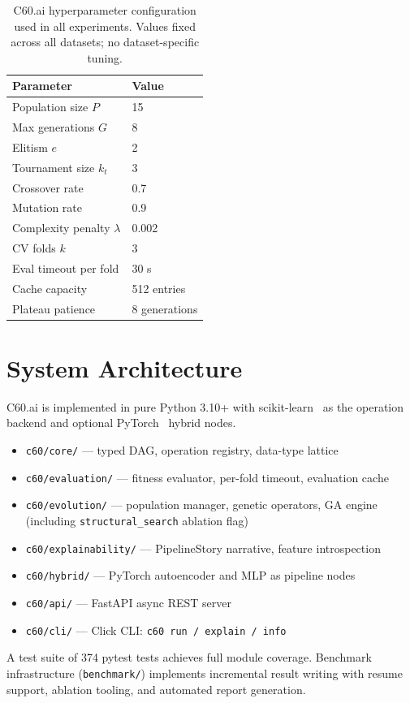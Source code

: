 \documentclass{article}
\theoremstyle{definition}
\theoremstyle{plain}
\theoremstyle{remark}
\begin{document}
\begin{table}[H]
  \caption{C60.ai hyperparameter configuration used in all experiments.
    Values fixed across all datasets; no dataset-specific tuning.}
  \label{tab:config}
  \begin{center}
    \begin{small}
      \begin{tabular}{ll}
        \toprule
        Parameter                    & Value          \\
        \midrule
        Population size $P$          & 15             \\
        Max generations $G$          & 8              \\
        Elitism $e$                  & 2              \\
        Tournament size $k_t$        & 3              \\
        Crossover rate               & 0.7            \\
        Mutation rate                & 0.9            \\
        Complexity penalty $\lambda$ & 0.002          \\
        CV folds $k$                 & 3              \\
        Eval timeout per fold        & 30 s           \\
        Cache capacity               & 512 entries    \\
        Plateau patience             & 8 generations  \\
        \bottomrule
      \end{tabular}
    \end{small}
  \end{center}
\end{table}

\section{System Architecture}
\label{app:arch}

C60.ai is implemented in pure Python 3.10+ with
scikit-learn~\cite{pedregosa2011scikit} as the operation backend and
optional PyTorch~\cite{paszke2019pytorch} hybrid nodes.

\begin{itemize}
  \item \texttt{c60/core/} — typed DAG, operation registry, data-type lattice
  \item \texttt{c60/evaluation/} — fitness evaluator, per-fold timeout,
        evaluation cache
  \item \texttt{c60/evolution/} — population manager, genetic operators,
        GA engine (including \texttt{structural\_search} ablation flag)
  \item \texttt{c60/explainability/} — PipelineStory narrative,
        feature introspection
  \item \texttt{c60/hybrid/} — PyTorch autoencoder and MLP as pipeline nodes
  \item \texttt{c60/api/} — FastAPI async REST server
  \item \texttt{c60/cli/} — Click CLI: \texttt{c60 run / explain / info}
\end{itemize}

A test suite of 374 pytest tests achieves full module coverage.
Benchmark infrastructure (\texttt{benchmark/}) implements incremental
result writing with resume support, ablation tooling, and automated
report generation.
\end{document}
